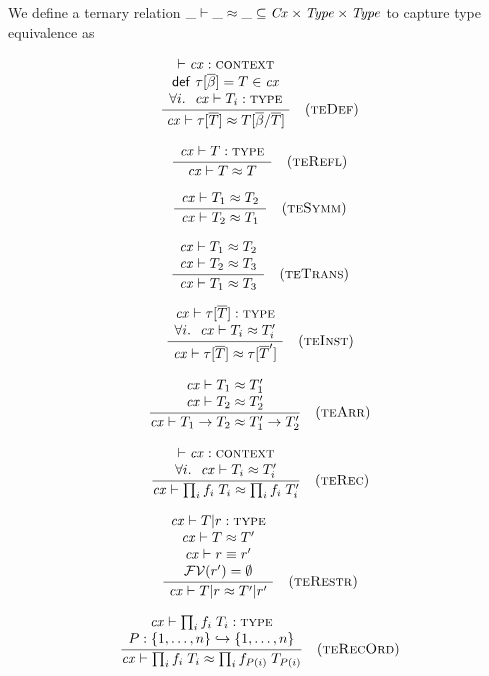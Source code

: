 We define a ternary relation $\ternrel{\teqY}{\Cx}{\Typ}{\Typ}$ to capture
type equivalence as

\[
\rruleIII
 {\cxwfO}
 {\tdefO\in\cx}
 {\FORALL{i}{\istyO{\typ_i}}}
 {\teqO{\tinstO}{\tsbslash{\typ}{\tvarS}{\typS}}}
 {\Rtedef}
\]

\[
\rruleI
 {\istyO{\typ}}
 {\teqO{\typ}{\typ}}
 {\Rterefl}
\]


\[
\rruleI
 {\teqO{\typ_1}{\typ_2}}
 {\teqO{\typ_2}{\typ_1}}
 {\Rtesymm}
\]

\[
\rruleII
 {\teqO{\typ_1}{\typ_2}}
 {\teqO{\typ_2}{\typ_3}}
 {\teqO{\typ_1}{\typ_3}}
 {\Rtetrans}
\]


\[
\rruleII
 {\istyO{\tinstO}}
 {\FORALL{i}{\teqO{\typ_i}{\typ_i'}}}
 {\teqO{\tinstO}{\tinst{\tnam}{\typS'}}}
 {\Rteinst}
\]

\[
\rruleII
 {\teqO{\typ_1}{\typ_1'}}
 {\teqO{\typ_2}{\typ_2'}}
 {\teqO{\tarr{\typ_1}{\typ_2}}{\tarr{\typ_1'}{\typ_2'}}}
 {\Rtearr}
\]

\[
\rruleII
 {\cxwfO}
 {\FORALL{i}{\teqO{\typ_i}{\typ_i'}}}
 {\teqO{\trecO}{\trec{i}{\fnam_i}{\typ_i'}}}
 {\Rterec}
\]


\[
\rruleIV
 {\istyO{\tsubO}}
 {\teqO{\typ}{\typ'}}
 {\theoO{\eq{\tspred}{\tspred'}}}
 {\efvar{\tspred'}=\emptyset}
 {\teqO{\tsubO}{\tsub{\typ'}{\tspred'}}}
 {\Rterestr}
\]


\[
\rruleII
 {\istyO{\trecO}}
 {\funcinj{\perm}{\setFT{1}{n}}{\setFT{1}{n}}}
 {\teqO{\trecO}{\trec{i}{\fnam_{\perm(i)}}{\typ_{\perm(i)}}}}
 {\Rterecord}
\]


